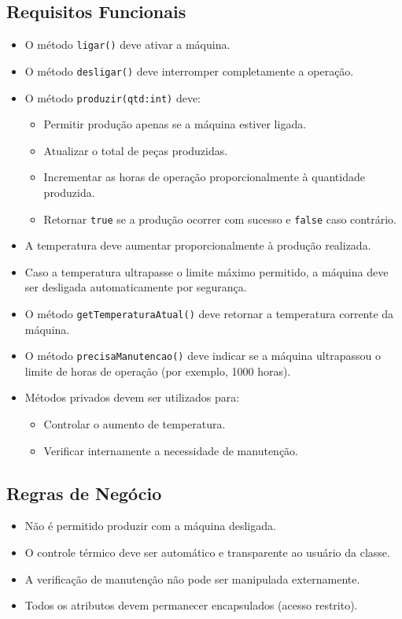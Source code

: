 \documentclass[12pt]{article}
\begin{document}
\subsection*{Requisitos Funcionais}

\begin{itemize}
    \item O método \texttt{ligar()} deve ativar a máquina.
    \item O método \texttt{desligar()} deve interromper completamente a operação.
    \item O método \texttt{produzir(qtd:int)} deve:
    \begin{itemize}
        \item Permitir produção apenas se a máquina estiver ligada.
        \item Atualizar o total de peças produzidas.
        \item Incrementar as horas de operação proporcionalmente à quantidade produzida.
        \item Retornar \texttt{true} se a produção ocorrer com sucesso e \texttt{false} caso contrário.
    \end{itemize}
    \item A temperatura deve aumentar proporcionalmente à produção realizada.
    \item Caso a temperatura ultrapasse o limite máximo permitido, a máquina deve ser desligada automaticamente por segurança.
    \item O método \texttt{getTemperaturaAtual()} deve retornar a temperatura corrente da máquina.
    \item O método \texttt{precisaManutencao()} deve indicar se a máquina ultrapassou o limite de horas de operação (por exemplo, 1000 horas).
    \item Métodos privados devem ser utilizados para:
    \begin{itemize}
        \item Controlar o aumento de temperatura.
        \item Verificar internamente a necessidade de manutenção.
    \end{itemize}
\end{itemize}

\subsection*{Regras de Negócio}

\begin{itemize}
    \item Não é permitido produzir com a máquina desligada.
    \item O controle térmico deve ser automático e transparente ao usuário da classe.
    \item A verificação de manutenção não pode ser manipulada externamente.
    \item Todos os atributos devem permanecer encapsulados (acesso restrito).
\end{itemize}
\end{document}
